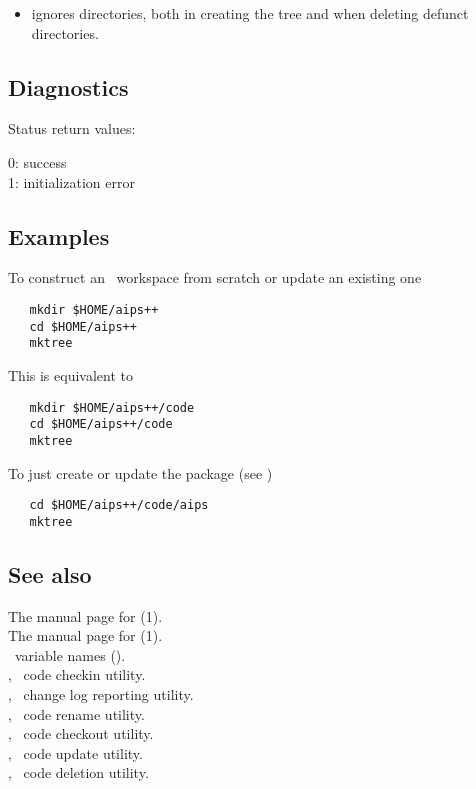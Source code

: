 \begin{itemize}
\item
    ignores  directories, both in creating the tree
   and when deleting defunct directories.
\end{itemize}

\subsection*{Diagnostics}

Status return values:
\begin{status}
   0: success\\
   1: initialization error
\end{status}

\subsection*{Examples}

To construct an \aipspp\ workspace from scratch or update an existing one

\begin{verbatim}
   mkdir $HOME/aips++
   cd $HOME/aips++
   mktree
\end{verbatim}

\noindent
This is equivalent to

\begin{verbatim}
   mkdir $HOME/aips++/code
   cd $HOME/aips++/code
   mktree
\end{verbatim}

\noindent
To just create or update the  package (see )

\begin{verbatim}
   cd $HOME/aips++/code/aips
   mktree
\end{verbatim}

\subsection*{See also}

The manual page for (1).\\
The manual page for (1).\\
\aipspp\ variable names ().\\
, \aipspp\ code checkin utility.\\
, \aipspp\ change log reporting utility.\\
, \aipspp\ code rename utility.\\
, \aipspp\ code checkout utility.\\
, \aipspp\ code update utility.\\
, \aipspp\ code deletion utility.

